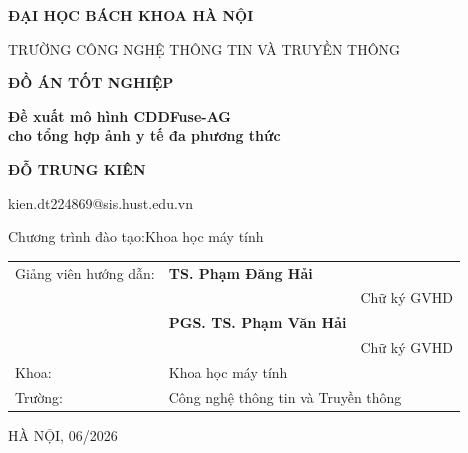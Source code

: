\begin{titlepage}
\centering

{\large\bfseries ĐẠI HỌC BÁCH KHOA HÀ NỘI\par}
\vspace{0.3cm}
{\normalsize TRƯỜNG CÔNG NGHỆ THÔNG TIN VÀ TRUYỀN THÔNG\par}

\vspace{2.5cm}

{\fontsize{32}{38}\bfseries ĐỒ ÁN TỐT NGHIỆP\par}

\vspace{1.2cm}

{\LARGE\bfseries
Đề xuất mô hình CDDFuse-AG\\[0.5em]
cho tổng hợp ảnh y tế đa phương thức\par}

\vspace{2cm}

{\Large\bfseries ĐỖ TRUNG KIÊN\par}
\vspace{0.3cm}
{\normalsize kien.dt224869@sis.hust.edu.vn\par}

\vspace{0.6cm}
{\normalsize Chương trình đào tạo:\quad Khoa học máy tính\par}

\vspace{2.5cm}

\begin{tabular}{@{}lll@{}}
Giảng viên hướng dẫn: & \textbf{TS. Phạm Đăng Hải}      & \underline{\hspace{4cm}} \\[2pt]
                       &                                   & \normalsize Chữ ký GVHD       \\[16pt]
                       & \textbf{PGS. TS. Phạm Văn Hải}  & \underline{\hspace{4cm}} \\[2pt]
                       &                                   & \normalsize Chữ ký GVHD       \\[16pt]
Khoa:                  & Khoa học máy tính                 &                          \\[8pt]
Trường:                & \multicolumn{2}{l}{Công nghệ thông tin và Truyền thông} \\
\end{tabular}

\vfill
{\large HÀ NỘI, 06/2026\par}

\end{titlepage}
